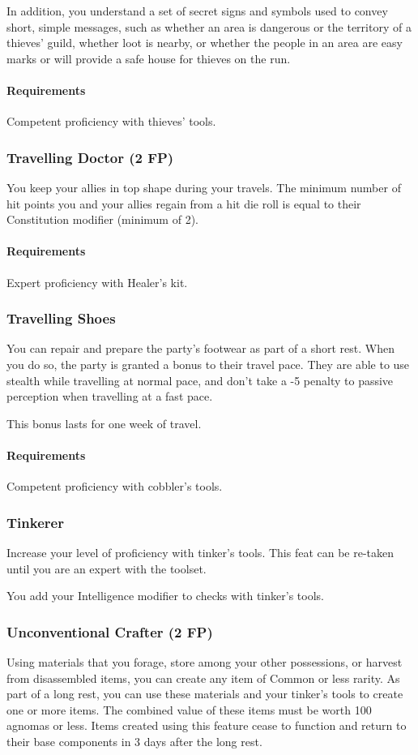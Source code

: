     In addition, you understand a set of secret signs and symbols used to convey short, simple messages, such as whether an area is dangerous or the territory of a thieves' guild, whether loot is nearby, or whether the people in an area are easy marks or will provide a safe house for thieves on the run.
    \paragraph{Requirements} Competent proficiency with thieves' tools.
\subsubsection{Travelling Doctor (2 FP)} \label{feat::travellingdoctor}
    You keep your allies in top shape during your travels.
    The minimum number of hit points you and your allies regain from a hit die roll is equal to their Constitution modifier (minimum of 2).
    \paragraph{Requirements} Expert proficiency with Healer's kit.
\subsubsection{Travelling Shoes} \label{feat::travellingshoes}
    You can repair and prepare the party's footwear as part of a short rest.
    When you do so, the party is granted a bonus to their travel pace.
    They are able to use stealth while travelling at normal pace, and don't take a -5 penalty to passive perception when travelling at a fast pace.

    This bonus lasts for one week of travel.
    \paragraph{Requirements} Competent proficiency with cobbler's tools.
\subsubsection{Tinkerer} \label{feat::tinkerer}
    Increase your level of proficiency with tinker's tools.
    This feat can be re-taken until you are an expert with the toolset.

    You add your Intelligence modifier to checks with tinker's tools.
\subsubsection{Unconventional Crafter (2 FP)} \label{feat::unconventionalcrafter}
    Using materials that you forage, store among your other possessions, or harvest from disassembled items, you can create any item of Common or less rarity.
    As part of a long rest, you can use these materials and your tinker's tools to create one or more items.
    The combined value of these items must be worth 100 agnomas or less.
    Items created using this feature cease to function and return to their base components in 3 days after the long rest.
